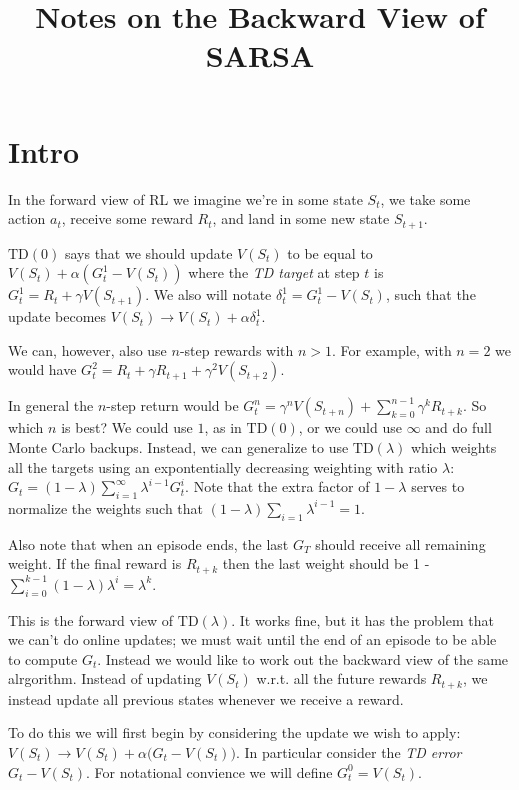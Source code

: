 \documentclass[11pt]{article}
\begin{document}
\title{Notes on the Backward View of SARSA}

\author{}

\maketitle

\section{Intro}
In the forward view of RL we imagine we're in some state $S_t$, we take some action $a_t$, receive some reward $R_t$,
and land in some new state $S_{t+1}$.

$\text{TD}(0)$ says that we should update $V(S_t)$ to be equal to $V(S_t) + \alpha (G^1_t - V(S_t))$ where the \emph{TD target}
at step $t$ is $G^1_t = R_t + \gamma V(S_{t+1})$.
We also will notate $\delta^1_t = G^1_t - V(S_t)$, such that the update becomes $V(S_t) \rightarrow V(S_t) + \alpha\delta^1_t$.

We can, however, also use $n$-step rewards with $n>1$. For example, with $n=2$ we would have
$G^2_t = R_t + \gamma R_{t+1} + \gamma^2 V(S_{t+2})$.

In general the $n$-step return would be $G^n_t = \gamma^n V(S_{t+n}) + \sum_{k=0}^{n - 1} \gamma^k R_{t+k}$.
So which $n$ is best? We could use $1$, as in $\text{TD}(0)$, or we could use $\infty$ and do full Monte Carlo backups.
Instead, we can generalize to use $\text{TD}(\lambda)$ which weights all the targets using an expontentially decreasing
weighting with ratio $\lambda$: $G_t = (1-\lambda) \sum_{i=1}^{\infty} \lambda^{i-1}G^i_t$.
Note that the extra factor of $1 - \lambda$ serves to normalize the weights such that $(1 - \lambda) \sum_{i=1} \lambda^{i-1} = 1$.

Also note that when an episode ends, the last $G_T$ should receive all remaining weight.
If the final reward is $R_{t+k}$ then the last weight should be 1 - $\sum_{i=0}^{k - 1} (1 - \lambda) \lambda^i = \lambda^k$.

This is the forward view of $\text{TD}(\lambda)$.
It works fine, but it has the problem that we can't do online updates; we must wait until the end of an episode to be able to compute $G_t$.
Instead we would like to work out the backward view of the same alrgorithm.
Instead of updating $V(S_t)$ w.r.t. all the future rewards $R_{t+k}$,
we instead update all previous states whenever we receive a reward.

To do this we will first begin by considering the update we wish to apply: $V(S_t) \rightarrow V(S_t) + \alpha\big(G_t - V(S_t)\big)$.
In particular consider the \emph{TD error} $G_t - V(S_t)$.
For notational convience we will define $G^0_t = V(S_t)$.
\end{document}
